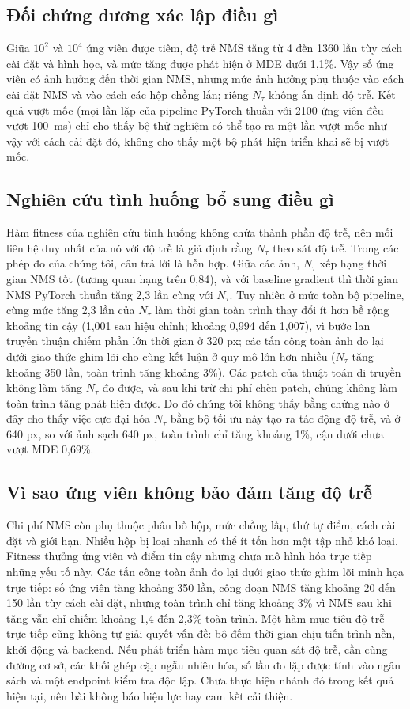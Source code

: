 \documentclass[a4paper,fleqn]{cas-dc}
\newcommand{\Ntau}{N_{\tau}}
\begin{document}
\subsection{Đối chứng dương xác lập điều gì}
Giữa $10^2$ và $10^4$ ứng viên được tiêm, độ trễ NMS tăng từ 4 đến 1360 lần tùy cách cài đặt và hình học, và mức tăng được phát hiện ở MDE dưới 1,1\%. Vậy số ứng viên có ảnh hưởng đến thời gian NMS, nhưng mức ảnh hưởng phụ thuộc vào cách cài đặt NMS và vào cách các hộp chồng lấn; riêng $\Ntau$ không ấn định độ trễ. Kết quả vượt mốc (mọi lần lặp của pipeline PyTorch thuần với 2100 ứng viên đều vượt 100~ms) chỉ cho thấy bệ thử nghiệm có thể tạo ra một lần vượt mốc như vậy với cách cài đặt đó, không cho thấy một bộ phát hiện triển khai sẽ bị vượt mốc.

\subsection{Nghiên cứu tình huống bổ sung điều gì}
Hàm fitness của nghiên cứu tình huống không chứa thành phần độ trễ, nên mối liên hệ duy nhất của nó với độ trễ là giả định rằng $\Ntau$ theo sát độ trễ. Trong các phép đo của chúng tôi, câu trả lời là hỗn hợp. Giữa các ảnh, $\Ntau$ xếp hạng thời gian NMS tốt (tương quan hạng trên 0,84), và với baseline gradient thì thời gian NMS PyTorch thuần tăng 2,3 lần cùng với $\Ntau$. Tuy nhiên ở mức toàn bộ pipeline, cùng mức tăng 2,3 lần của $\Ntau$ làm thời gian toàn trình thay đổi ít hơn bề rộng khoảng tin cậy (1,001 sau hiệu chỉnh; khoảng 0,994 đến 1,007), vì bước lan truyền thuận chiếm phần lớn thời gian ở 320 px; các tấn công toàn ảnh đo lại dưới giao thức ghim lõi cho cùng kết luận ở quy mô lớn hơn nhiều ($\Ntau$ tăng khoảng 350 lần, toàn trình tăng khoảng 3\%). Các patch của thuật toán di truyền không làm tăng $\Ntau$ đo được, và sau khi trừ chi phí chèn patch, chúng không làm toàn trình tăng phát hiện được. Do đó chúng tôi không thấy bằng chứng nào ở đây cho thấy việc cực đại hóa $\Ntau$ bằng bộ tối ưu này tạo ra tác động độ trễ, và ở 640 px, so với ảnh sạch 640 px, toàn trình chỉ tăng khoảng 1\%, cận dưới chưa vượt MDE 0,69\%.

\subsection{Vì sao ứng viên không bảo đảm tăng độ trễ}
Chi phí NMS còn phụ thuộc phân bố hộp, mức chồng lấp, thứ tự điểm, cách cài đặt và giới hạn. Nhiều hộp bị loại nhanh có thể ít tốn hơn một tập nhỏ khó loại. Fitness thưởng ứng viên và điểm tin cậy nhưng chưa mô hình hóa trực tiếp những yếu tố này. Các tấn công toàn ảnh đo lại dưới giao thức ghim lõi minh họa trực tiếp: số ứng viên tăng khoảng 350 lần, công đoạn NMS tăng khoảng 20 đến 150 lần tùy cách cài đặt, nhưng toàn trình chỉ tăng khoảng 3\% vì NMS sau khi tăng vẫn chỉ chiếm khoảng 1,4 đến 2,3\% toàn trình. Một hàm mục tiêu độ trễ trực tiếp cũng không tự giải quyết vấn đề: bộ đếm thời gian chịu tiến trình nền, khởi động và backend. Nếu phát triển hàm mục tiêu quan sát độ trễ, cần cùng đường cơ sở, các khối ghép cặp ngẫu nhiên hóa, số lần đo lặp được tính vào ngân sách và một endpoint kiểm tra độc lập. Chưa thực hiện nhánh đó trong kết quả hiện tại, nên bài không báo hiệu lực hay cam kết cải thiện.
\end{document}
